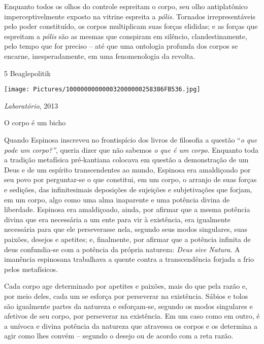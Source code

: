 Enquanto todos os olhos do controle espreitam o corpo, seu olho
antiplatônico imperceptivelmente exposto na vitrine espreita a
\emph{pólis. }Tornados irrepresentáveis pelo poder constituído, os
corpos multiplicam suas forças elididas; e as forças que espreitam a
\emph{pólis} são as mesmas que conspiram em silêncio, clandestinamente,
pelo tempo que for preciso -- até que uma ontologia profunda dos corpos
se encarne, inesperadamente, em uma fenomenologia da revolta.

5 Beaglepolitik

\texttt{[image: Pictures/100000000000032000000258386FB536.jpg]}

\emph{Laboratório}, 2013

O corpo é um bicho

\textbf{}Quando Espinosa inscreveu no frontispício dos livros de
filosofia a questão ``\emph{o que pode um corpo?''}, queria dizer que
não sabemos \emph{o que é um corpo}. Enquanto toda a tradição metafísica
pré-kantiana colocava em questão a demonstração de um Deus e de um
espírito transcendentes ao mundo, Espinosa era amaldiçoado por seu povo
por perguntar-se o que constitui, em um corpo, o arranjo de suas forças
e sedições, das infinitesimais deposições de sujeições e subjetivações
que forjam, em um corpo, algo como uma alma inaparente e uma potência
divina de liberdade. Espinosa era amaldiçoado, ainda, por afirmar que a
mesma potência divina que era necessária a um ente para vir à
existência, era igualmente necessária para que ele perseverasse nela,
segundo seus modos singulares, suas paixões, desejos e apetites; e,
finalmente, por afirmar que a potência infinita de deus confundia-se com
a potência da própria natureza: \emph{Deus sive Natura}. A imanência
espinosana trabalhava a quente contra a transcendência forjada a frio
pelos metafísicos.

Cada corpo age determinado por apetites e paixões, mais do que pela
razão e, por meio deles, cada um se esforça por perseverar na
existência. Sábios e tolos são igualmente partes da natureza e
esforçam-se, segundo os modos singulares e afetivos de seu corpo, por
perseverar na existência. Em um caso como em outro, é a unívoca e divina
potência da natureza que atravessa os corpos e os determina a agir como
lhes convém -- segundo o desejo ou de acordo com a reta razão.

